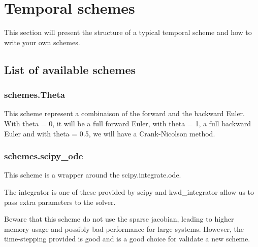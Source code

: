 \documentclass[letterpaper,10pt,english]{sphinxmanual}
\begin{document}
\chapter{Temporal schemes}
\label{\detokenize{schemes::doc}}\label{\detokenize{schemes:temporal-schemes}}\label{\detokenize{schemes:superlu}}
This section will present the structure of a typical temporal scheme and how to write your own schemes.


\section{List of available schemes}
\label{\detokenize{schemes:list-of-available-schemes}}

\subsection{schemes.Theta}
\label{\detokenize{schemes:schemes-theta}}
\begin{sphinxVerbatim}[commandchars=\\\{\}]
   
\end{sphinxVerbatim}

This scheme represent a combinaison of the forward and the backward Euler. With theta = 0, it will be a full forward Euler, with theta = 1, a full backward Euler and with theta = 0.5, we will have a Crank-Nicolson method.


\subsection{schemes.scipy\_ode}
\label{\detokenize{schemes:schemes-scipy-ode}}
\begin{sphinxVerbatim}[commandchars=\\\{\}]
    
\end{sphinxVerbatim}

This scheme is a wrapper around the scipy.integrate.ode.

The integrator is one of these provided by scipy and kwd\_integrator allow us to pass extra parameters to the solver.

Beware that this scheme do not use the sparse jacobian, leading to higher memory usage and possibly bad performance for large systems. However, the time-stepping provided is good and is a good choice for validate a new scheme.
\end{document}
